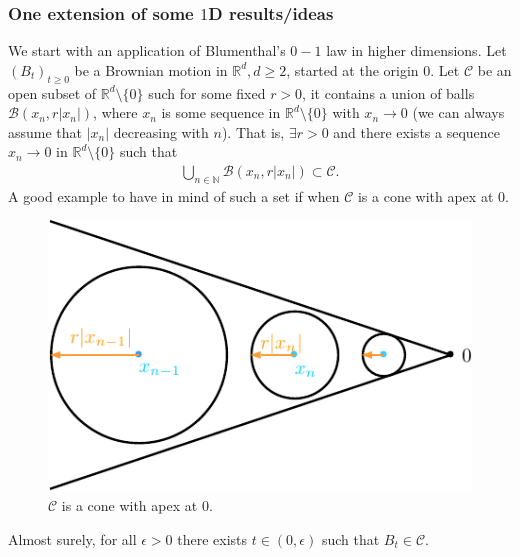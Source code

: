 \documentclass[../mainfile.tex]{subfiles}
\begin{document}
\subsubsection{One extension of some $1$D results/ideas}
We start with an application of Blumenthal's $0-1$ law in higher dimensions. Let $(B_t)_{t \geq 0}$ be a Brownian motion in $\mathbb{R}^d, d \geq 2$, started at the origin $0$. Let $\mathcal{C}$ be an open subset of $\mathbb{R}^d \setminus \{0\}$ such for some fixed $r>0$, it contains a union of balls $\mathcal{B}(x_n,r|x_n|)$, where $x_n$ is some sequence in $\mathbb{R}^d \setminus \{0\}$ with $x_n \to 0$ (we can always assume that $|x_n|$ decreasing with $n$). That is, $\exists r>0$ and there exists a sequence $x_n \to 0$ in $\mathbb{R}^d \setminus \{0\}$ such that 
\begin{align*}
\bigcup_{n \in \mathbb{N}} \mathcal{B}(x_n,r|x_n|) \subset \mathcal{C}. 
\end{align*}
A good example to have in mind of such a set if when $\mathcal{C}$ is a cone with apex at $0$. 
\begin{figure}[hbtp]
\centering
\includegraphics[scale=1]{cone.pdf}
\caption{$\mathcal{C}$ is a cone with apex at $0$.}
\end{figure}
\newpage
\begin{prop} Almost surely, for all $\epsilon >0$ there exists $t \in (0, \epsilon)$ such that $B_t \in \mathcal{C}$. 
\end{prop}
\end{document}
